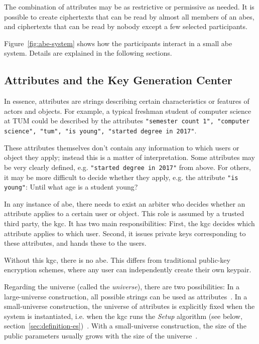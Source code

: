The combination of attributes may be as restrictive or permissive as needed.
It is possible to create ciphertexts that can be read by almost all members of an \acrshort{abes}, and ciphertexts that can be read by nobody except a few selected participants.

Figure~\ref{fig:abe-system} shows how the participants interact in a small \acrshort{abe} system.
Details are explained in the following sections.

\subsection{Attributes and the Key Generation Center}\label{sec:kgc}



In essence, attributes are strings describing certain characteristics or features of actors and objects.
For example, a typical freshman student of computer science at TUM could be described by the attributes \texttt{"semester count 1", "computer science", "tum", "is young", "started degree in 2017"}.

These attributes themselves don't contain any information to which users or object they apply; instead this is a matter of interpretation.
Some attributes may be very clearly defined, e.g. \texttt{"started degree in 2017"} from above.
For others, it may be more difficult to decide whether they apply, e.g. the attribute \texttt{"is young"}: Until what age is a student young?

In any instance of \acrshort{abe}, there needs to exist an arbiter who decides whether an attribute applies to a certain user or object.
This role is assumed by a trusted third party, the \acrfull{kgc}.
It has two main responsibilities: First, the \acrshort{kgc} decides which attribute applies to which user.
Second, it issues private keys corresponding to these attributes, and hands these to the users.

Without this \acrshort{kgc}, there is no \acrshort{abe}.
This differs from traditional public-key encryption schemes, where any user can independently create their own keypair.

Regarding the \glsdesc{universe} (called the \emph{\gls{universe}}), there are two possibilities:
In a \gls{large-universe} construction, all possible strings can be used as attributes~\cite{goyal_attribute-based_2006}.
In a \gls{small-universe} construction, the universe of attributes is explicitly fixed when the system is instantiated, i.e. when the \acrshort{kgc} runs the \emph{Setup} algorithm (see below, section~\ref{sec:definition-es})~\cite{goyal_attribute-based_2006}.
With a \gls{small-universe} construction, the size of the public parameters usually grows with the size of the \gls{universe}~\cite{goyal_attribute-based_2006}.


